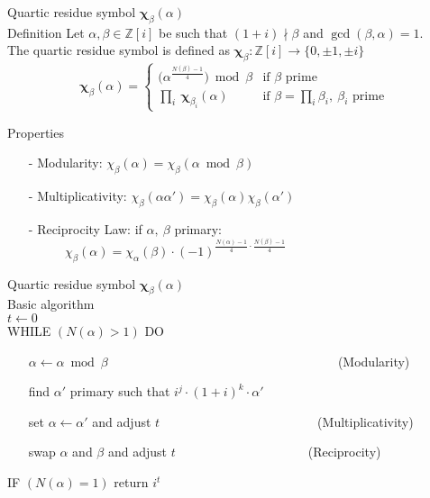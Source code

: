 \documentclass[a4, landscape, slidesonly]{seminar}
\renewcommand{\emph}[1]{{\color{emphcolor} #1}}
\newcommand{\slidetitle}[1]{{\large \color{titlecolor} #1}}
\begin{document}
\begin{slide}
\slidetitle{Quartic residue symbol $\mathbf{\chi}_{\beta}(\alpha)$}
\\[0.5cm]
\emph{Definition}
Let $\alpha,\beta \in \mathbb{Z}[{i}]$ be such that $(1+i) \nmid \beta$ and $\gcd(\beta,\alpha) = 1$. \\
The \emph{quartic residue symbol} is defined as $ 
 \mathbf{\chi}_{\beta} : \mathbb{Z}[{i}] \to \{ 0,\pm 1, \pm i\}$ 
 \begin{displaymath} 
 \mathbf{\chi}_{\beta}(\alpha) = \left\{ 
 \begin{array}{ll} 
     \big(\alpha^{\frac{N(\beta)-1}{4}}\big)\bmod \beta & 
         \textrm{if $\beta$ prime}\\ 
     \prod _{i} ~\mathbf{\chi}_{\beta _{i}}(\alpha) & 
         \textrm{if $\beta = \prod _ {i} \beta _{i},~ \beta_{i}$ prime} 
 \end{array} \right. 
 \end{displaymath}
 
 \emph{Properties}
  \begin{itemize} 
 \item[-] Modularity: $\chi_{\beta}(\alpha) = \chi_{\beta}(\alpha \bmod \beta)$ 
 \item[-] Multiplicativity: $\chi_{\beta}(\alpha\alpha') = \chi_{\beta}(\alpha)\chi_{\beta}(\alpha')$ 
 \item[-] Reciprocity Law: if $\alpha,~\beta$ primary:\\ $~~~~~~~~~~~~~\chi_{\beta}(\alpha) = \chi_{\alpha}(\beta)\cdot 
     (-1)^{\frac{N(\alpha)-1}{4}\cdot \frac{N(\beta)-1}{4}}~~~$ 
 \end{itemize} 
\end{slide}
\begin{slide}
\slidetitle{Quartic residue symbol $\mathbf{\chi}_{\beta}(\alpha)$}
\\[0.5cm]
\emph{Basic algorithm}\\[.2cm]
$t \gets 0$\\
{WHILE} $(N(\alpha) > 1)$ DO\begin{itemize}
\item[] $\alpha \gets \alpha \bmod \beta~$~~~~~~~~~~~~~~~~~~~~~~~~~~~~~~~~~~~~(Modularity)
\item[] find $\alpha'$ primary such that $i^j \cdot (1+i)^k \cdot \alpha'$
\item[] set $\alpha \gets \alpha'$ and adjust $t$~~~~~~~~~~~~~~~~~~~~~~~~~(Multiplicativity)
\item[] swap $\alpha$ and $\beta$ and adjust $t$~~~~~~~~~~~~~~~~~~~~~(Reciprocity)
\end{itemize} 
{IF} $(N(\alpha) = 1)$ return $i^t$
\end{slide}
\end{document}

